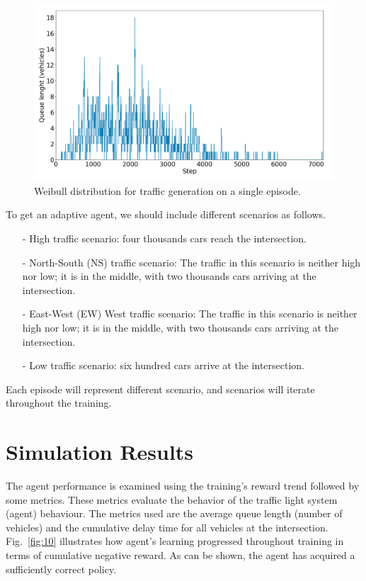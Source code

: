 \documentclass[conference]{IEEEtran}
\begin{document}
\begin{figure}[!ht]
    \centering
    \begin{center}
    \includegraphics[scale=0.25]{images/weibull.png}
    \end{center}
    \caption{Weibull distribution for traffic generation on a single episode.}
    \label{fig:9}
\end{figure}

To get an adaptive agent, we should include different scenarios as follows.
\begin{enumerate}
    \item [-] High traffic scenario: four thousands cars reach the intersection.
    \item [-] North-South (NS) traffic scenario: The traffic in this scenario is neither high nor low; it is in the middle, with two thousands cars arriving at the intersection.
    \item [-] East-West (EW) West traffic scenario: The traffic in this scenario is neither high nor low; it is in the middle, with two thousands cars arriving at the intersection.
    \item [-] Low traffic scenario: six hundred cars arrive at the intersection.
    
\end{enumerate}
Each episode will represent different scenario, and scenarios will iterate throughout the training.


\section{Simulation Results}\label{SR}

The agent performance is examined using the training's reward trend followed by some metrics. These metrics evaluate the behavior of the traffic light system (agent) behaviour. The metrics used are the average queue length (number of vehicles) and the cumulative delay time for all vehicles at the intersection. Fig.~\ref{fig:10} illustrates how agent's learning progressed throughout training in terms of cumulative negative reward. As can be shown, the agent has acquired a sufficiently correct policy. 
\end{document}
